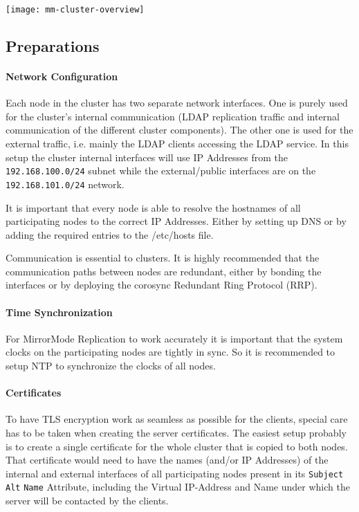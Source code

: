 \documentclass[a4paper,11pt,DIV=12]{scrartcl}
\begin{document}
    \begin{center}
        \texttt{[image: mm-cluster-overview]}
    \end{center}

\subsection{Preparations}

\paragraph{Network Configuration}
    Each node in the cluster has two separate network interfaces. One is
    purely used for the cluster's internal communication (LDAP replication
    traffic and internal communication of the different cluster components).
    The other one is used for the external traffic, i.e. mainly the LDAP
    clients accessing the LDAP service. In this setup the cluster internal
    interfaces will use IP Addresses from the \verb|192.168.100.0/24| subnet
    while the external/public interfaces are on the  \verb|192.168.101.0/24|
    network.

    It is important that every node is able to resolve the hostnames of all
    participating nodes to the correct IP Addresses. Either by setting up
    DNS or by adding the required entries to the /etc/hosts file.

    Communication is essential to clusters. It is highly recommended that the
    communication paths between nodes are redundant, either by bonding the
    interfaces or by deploying the corosync Redundant Ring Protocol (RRP).

\paragraph{Time Synchronization}
    For MirrorMode Replication to work accurately it is important that the
    system clocks on the participating nodes are tightly in sync. So it is
    recommended to setup NTP to synchronize the clocks of all nodes.

\paragraph{Certificates}
    To have TLS encryption work as seamless as possible for the clients,
    special care has to be taken when creating the server certificates. The
    easiest setup probably is to create a single certificate for the whole
    cluster that is copied to
    both nodes. That certificate would need to have the names (and/or IP
    Addresses) of the internal and external interfaces of all participating
    nodes present in its \verb|Subject| \verb|Alt| \verb|Name| Attribute,
    including the Virtual IP-Address and Name under which the server will be
    contacted by the clients.
\end{document}
